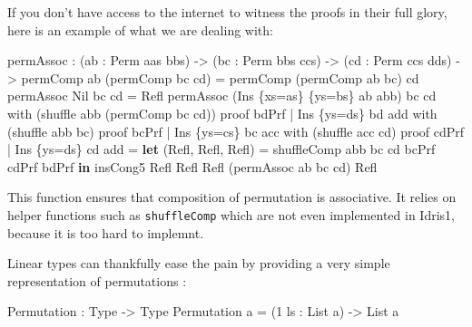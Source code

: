 \documentclass[
]{article}
\newenvironment{Shaded}{}{}
\newcommand{\DataTypeTok}[1]{\textcolor[rgb]{0.56,0.13,0.00}{#1}}
\newcommand{\DecValTok}[1]{\textcolor[rgb]{0.25,0.63,0.44}{#1}}
\newcommand{\KeywordTok}[1]{\textcolor[rgb]{0.00,0.44,0.13}{\textbf{#1}}}
\newcommand{\NormalTok}[1]{#1}
\newcommand{\OperatorTok}[1]{\textcolor[rgb]{0.40,0.40,0.40}{#1}}
\newcommand{\OtherTok}[1]{\textcolor[rgb]{0.00,0.44,0.13}{#1}}
\begin{document}
If you don't have access to the internet to witness the proofs in their
full glory, here is an example of what we are dealing with:

\begin{Shaded}
\begin{Highlighting}[]
\NormalTok{permAssoc }\OperatorTok{:}\NormalTok{ (ab }\OperatorTok{:} \DataTypeTok{Perm}\NormalTok{ aas bbs) }\OtherTok{{-}\textgreater{}}\NormalTok{ (bc }\OperatorTok{:} \DataTypeTok{Perm}\NormalTok{ bbs ccs) }
         \OtherTok{{-}\textgreater{}}\NormalTok{ (cd }\OperatorTok{:} \DataTypeTok{Perm}\NormalTok{ ccs dds)}
         \OtherTok{{-}\textgreater{}}\NormalTok{ permComp ab (permComp bc cd) }\OtherTok{=}\NormalTok{ permComp (permComp ab bc) cd}
\NormalTok{permAssoc }\DataTypeTok{Nil}\NormalTok{ bc cd }\OtherTok{=} \DataTypeTok{Refl}
\NormalTok{permAssoc (}\DataTypeTok{Ins}\NormalTok{ \{xs}\OtherTok{=}\NormalTok{as\} \{ys}\OtherTok{=}\NormalTok{bs\} ab\textquotesingle{} abb) bc cd }
\NormalTok{  with (shuffle abb (permComp bc cd)) proof bdPrf}
  \OperatorTok{|} \DataTypeTok{Ins}\NormalTok{ \{ys}\OtherTok{=}\NormalTok{ds\} bd\textquotesingle{} add with (shuffle abb bc) proof bcPrf}
    \OperatorTok{|} \DataTypeTok{Ins}\NormalTok{ \{ys}\OtherTok{=}\NormalTok{cs\} bc\textquotesingle{} acc with (shuffle acc cd) proof cdPrf}
      \OperatorTok{|} \DataTypeTok{Ins}\NormalTok{ \{ys}\OtherTok{=}\NormalTok{ds\textquotesingle{}\} cd\textquotesingle{} ad\textquotesingle{}d }\OtherTok{=}
        \KeywordTok{let}\NormalTok{ (}\DataTypeTok{Refl}\NormalTok{, }\DataTypeTok{Refl}\NormalTok{, }\DataTypeTok{Refl}\NormalTok{) }\OtherTok{=}\NormalTok{ shuffleComp abb bc cd bcPrf cdPrf bdPrf}
         \KeywordTok{in}\NormalTok{ insCong5 }\DataTypeTok{Refl} \DataTypeTok{Refl} \DataTypeTok{Refl}\NormalTok{ (permAssoc ab\textquotesingle{} bc\textquotesingle{} cd\textquotesingle{}) }\DataTypeTok{Refl}
\end{Highlighting}
\end{Shaded}

This function ensures that composition of permutation is associative. It
relies on helper functions such as \texttt{shuffleComp} which are not
even implemented in Idris1, because it is too hard to implemnt.

Linear types can thankfully ease the pain by providing a very simple
representation of permutations :

\begin{Shaded}
\begin{Highlighting}[]
\DataTypeTok{Permutation} \OperatorTok{:} \DataTypeTok{Type} \OtherTok{{-}\textgreater{}} \DataTypeTok{Type}
\DataTypeTok{Permutation}\NormalTok{ a }\OtherTok{=}\NormalTok{ (}\DecValTok{1}\NormalTok{ ls }\OperatorTok{:} \DataTypeTok{List}\NormalTok{ a) }\OtherTok{{-}\textgreater{}} \DataTypeTok{List}\NormalTok{ a}
\end{Highlighting}
\end{Shaded}
\end{document}
